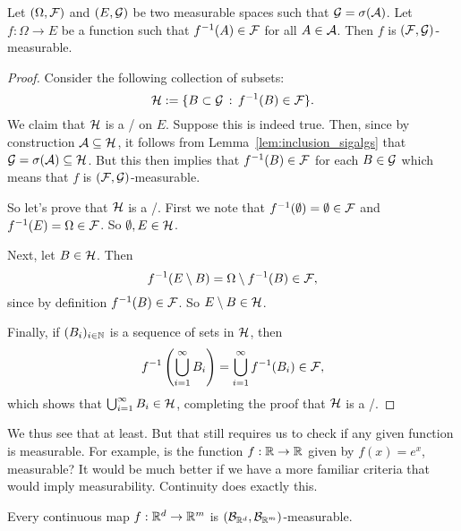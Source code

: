 \begin{lemma}\label{lem:measurable_condition_generator}
Let $(\Omega, \mathcal F)$ and $(E, \mathcal G)$ be two measurable spaces such that $\mathcal G = \sigma(\mathcal A)$. Let $f: \Omega \to E$ be a function such that $f^{-1}(A) \in \mathcal F$ for all $A \in \mathcal A$. Then $f$ is $(\mathcal F, \mathcal G)$-measurable.
\end{lemma}

\begin{proof}
Consider the following collection of subsets:
\[
	\mathcal H := \{B \subset \mathcal G \, : \, f^{-1}(B) \in \mathcal F\}.
\]
We claim that $\mathcal H$ is a \sigalg/ on $E$. Suppose this is indeed true. Then, since by construction $\mathcal A \subseteq \mathcal H$, it follows from Lemma~\ref{lem:inclusion_sigalgs} that $\mathcal G = \sigma(\mathcal A) \subseteq \mathcal H$. But this then implies that $f^{-1}(B) \in \mathcal F$ for each $B \in \mathcal G$ which means that $f$ is $(\mathcal F, \mathcal G)$-measurable.

So let's prove that $\mathcal H$ is a \sigalg/. First we note that $f^{-1}(\emptyset) = \emptyset \in \mathcal F$ and $f^{-1}(E) = \Omega \in \mathcal F$. So $\emptyset, E \in \mathcal H$. 

Next, let $B \in \mathcal H$. Then
\[
	f^{-1}(E\setminus B) = \Omega \setminus f^{-1}(B) \in \mathcal F,
\]
since by definition $f^{-1}(B) \in \mathcal F$. So $E\setminus B \in \mathcal H$.

Finally, if $(B_i)_{i \in \mathbb N}$ is a sequence of sets in $\mathcal H$, then
\[
	f^{-1}\left(\bigcup_{i = 1}^\infty B_i\right) = \bigcup_{i = 1}^\infty f^{-1}(B_i) \in \mathcal F,
\]
which shows that $\bigcup_{i = 1}^\infty B_i \in \mathcal H$, completing the proof that $\mathcal H$ is a \sigalg/.
\end{proof}

We thus see that at least. But that still requires us to check if any given function is measurable. For example, is the function $f : \mathbb R \to \mathbb R$ given by $f(x) = e^x$, measurable? It would be much better if we have a more familiar criteria that would imply measurability. Continuity does exactly this. 

\pagebreak

\begin{proposition}
Every continuous map $f : \mathbb R^d \to \mathbb R^m$ is $(\mathcal B_{\mathbb R^d}, \mathcal B_{\mathbb R^m})$-measurable.
\end{proposition}

